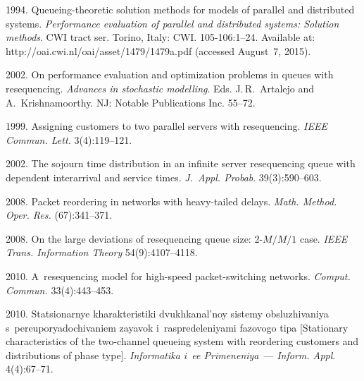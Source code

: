   \begin{multicols}{2}

\renewcommand{\bibname}{\protect\rmfamily References}

{\small\frenchspacing
 {%
 \begin{thebibliography}{99}


 1994. 
Queueing-theoretic solution methods for models of parallel and distributed systems.
\textit{Performance evaluation of parallel and distributed systems: Solution methods}. 
CWI tract ser. Torino, Italy: CWI. 105-106:1--24. Available at: 
{\sf http://oai.cwi.nl/oai/asset/1479/1479a.pdf} (accessed August~7, 2015).


 2002.
On performance evaluation and optimization problems in queues with resequencing.
\textit{Advances in stochastic modelling}. Eds. J.\,R.~Artalejo
and A.~Krishnamoorthy.
 NJ: Notable Publications Inc. 55--72.

 1999. 
Assigning customers to two parallel servers with resequencing.
\textit{IEEE Commun. Lett.} 3(4):119--121.

 2002. 
The sojourn time distribution in an infinite server resequencing queue with dependent interarrival and service times.
\textit{J.~Appl. Probab}. 39(3):590--603.



 2008.
Packet reordering in networks with heavy-tailed delays.
\textit{Math. Method. Oper. Res.} (67):341--371.

 2008.
On the large deviations of resequencing
queue size: 2-$M/M/1$ case. \textit{IEEE Trans. Information Theory} 54(9):4107--4118.


 2010.
A~resequencing model for high-speed packet-switching networks.
\textit{Comput. Commun.} 33(4):443--453.


 2010.
Statsionarnye kha\-rak\-te\-ri\-sti\-ki dvukhkanal'noy sistemy obsluzhivaniya 
s~pe\-re\-upo\-rya\-do\-chi\-va\-ni\-em zayavok i~raspredeleniyami fazovogo tipa 
[Stationary characteristics of the two-channel queueing system with
reordering customers and distributions of phase type]. 
\textit{Informatika i~ee Primeneniya}~--- \textit{Inform. Appl}. 4(4):67--71.


\end{thebibliography}}}
\end{multicols}
